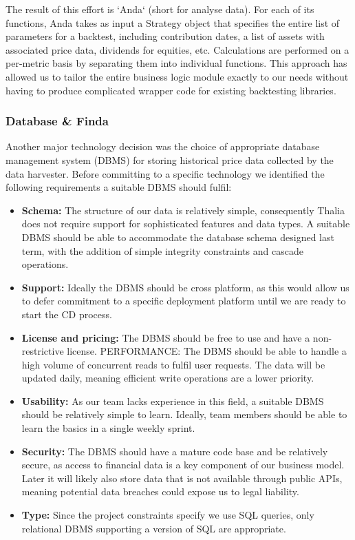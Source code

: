 \documentclass[main.tex]{subfiles}
\begin{document}
The result of this effort is `Anda` (short for analyse data). For each of its functions, Anda takes as input a Strategy object that specifies the entire list of parameters for a backtest, including contribution dates, a list of assets with associated price data, dividends for equities, etc. Calculations are performed on a per-metric basis by separating them into individual functions.
This approach has allowed us to tailor the entire business logic module exactly to our needs without having to produce complicated wrapper code for existing backtesting libraries.

\subsubsection{Database \& Finda}
\label{Finda}

Another major technology decision was the choice of appropriate database management system (DBMS) for storing historical price data collected by the data harvester. Before committing to a specific technology we identified the following requirements a suitable DBMS should fulfil:

\begin {itemize}
\item \textbf{Schema:} The structure of our data is relatively simple, consequently Thalia does not require support for sophisticated features and data types. A suitable DBMS should be able to accommodate the database schema designed last term, with the addition of simple integrity constraints and cascade operations.
\item \textbf{Support:} Ideally the DBMS should be cross platform, as this would allow us to defer commitment to a specific deployment platform until we are ready to start the CD process. 
\item \textbf{License and pricing:} The DBMS should be free to use and have a non-restrictive license.
PERFORMANCE: The DBMS should be able to handle a high volume of concurrent reads to fulfil user requests. The data will be updated daily, meaning efficient write operations are a lower priority.
\item \textbf{Usability:} As our team lacks experience in this field, a suitable DBMS should be relatively simple to learn. Ideally, team members should be able to learn the basics in a single weekly sprint.
\item \textbf{Security:} The DBMS should have a mature code base and be relatively secure, as access to financial data is a key component of our business model. Later it will likely also store data that is not available through public APIs, meaning potential data breaches could expose us to legal liability. \cite{dataprotectionGov}
\item \textbf{Type:} Since the project constraints specify we use SQL queries, only relational DBMS supporting a version of SQL are appropriate.

\end{itemize}
\end{document}
